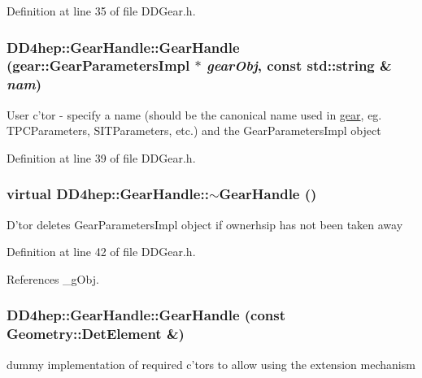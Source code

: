 Definition at line 35 of file DDGear.h.\hypertarget{class_d_d4hep_1_1_gear_handle_adeb098c8edf707d3d122de032ff476fd}{
\subsubsection[{GearHandle}]{\setlength{\rightskip}{0pt plus 5cm}DD4hep::GearHandle::GearHandle (gear::GearParametersImpl $\ast$ {\em gearObj}, \/  const std::string \& {\em nam})}}
\label{class_d_d4hep_1_1_gear_handle_adeb098c8edf707d3d122de032ff476fd}
User c'tor -\/ specify a name (should be the canonical name used in \hyperlink{namespacegear}{gear}, eg. TPCParameters, SITParameters, etc.) and the GearParametersImpl object 

Definition at line 39 of file DDGear.h.\hypertarget{class_d_d4hep_1_1_gear_handle_a7b8b36839e741d9d3e4bb22f44262f01}{
\subsubsection[{$\sim$GearHandle}]{\setlength{\rightskip}{0pt plus 5cm}virtual DD4hep::GearHandle::$\sim$GearHandle ()}}
\label{class_d_d4hep_1_1_gear_handle_a7b8b36839e741d9d3e4bb22f44262f01}
D'tor deletes GearParametersImpl object if ownerhsip has not been taken away 

Definition at line 42 of file DDGear.h.

References \_\-gObj.\hypertarget{class_d_d4hep_1_1_gear_handle_a08d410c5f9ea89384c3166fe42f0bae8}{
\subsubsection[{GearHandle}]{\setlength{\rightskip}{0pt plus 5cm}DD4hep::GearHandle::GearHandle (const {\bf Geometry::DetElement} \&)}}
\label{class_d_d4hep_1_1_gear_handle_a08d410c5f9ea89384c3166fe42f0bae8}
dummy implementation of required c'tors to allow using the extension mechanism 

